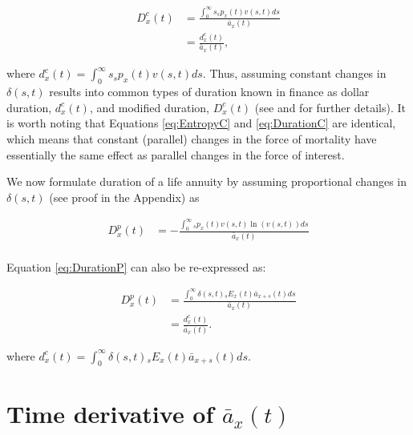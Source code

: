 \documentclass[12pt]{article}
\begin{document}
\begin{equation}\label{eq:DurationC}
\begin{split}
{D}^{c}_x(t)&= \frac{\int_0^\infty s {}_sp_x(t) {v}(s,t)ds}{\bar{a}_x(t)} \\
&= \frac{{d}^{c}_x(t)}{\bar{a}_x(t)},
\end{split}
\end{equation}

where ${d}^{c}_x(t)=\int_0^\infty s {}_sp_x(t) {v}(s,t)ds$. Thus, assuming constant changes in $\delta(s,t)$ results into common types of duration known in finance as dollar duration, ${d}^{c}_x(t)$, and modified duration, ${D}^{c}_x(t)$ (see \citet{Milevsky2012} and \citet{Tsai2013a} for further details). It is worth noting that Equations \ref{eq:EntropyC} and \ref{eq:DurationC} are identical, which means that constant (parallel) changes in the force of mortality have essentially the same effect as parallel changes in the force of interest.




We now formulate duration of a life annuity by assuming proportional changes in $\delta(s,t)$ (see proof in the Appendix) as 


\begin{equation}\label{eq:DurationP}
\begin{split}
{D}^{p}_{x}(t) &= -\frac{\int_0^\infty {}_sp_x(t) v(s,t) \ln(v(s,t))ds}{\bar{a}_x(t)} \\
\end{split}
\end{equation}

Equation \ref{eq:DurationP} can also be re-expressed as:

\begin{equation}\label{eq:DurationP2}
\begin{split}
{D}^{p}_{x}(t) &= \frac{\int_0^\infty \delta(s,t) {}_sE_x(t) \bar{a}_{x+s}(t)ds} {\bar{a}_x(t)} \\
                 &= \frac{{d}^{c}_{x}(t)}{\bar{a}_x(t)}.
\end{split}
\end{equation}


where ${d}^{c}_{x}(t)=\int_0^\infty \delta(s,t) {}_sE_x(t) \bar{a}_{x+s}(t) ds$. 



\section{Time derivative of $\bar{a}_x(t)$}
\end{document}

